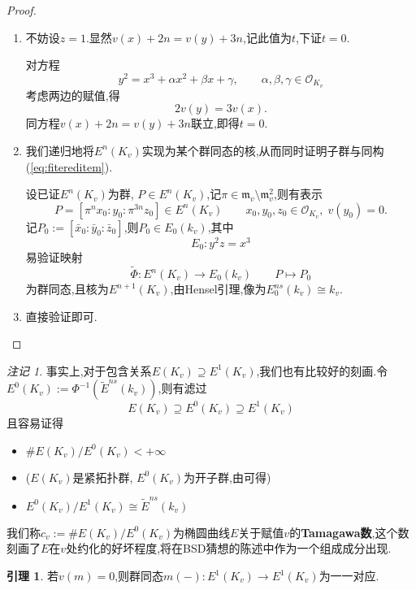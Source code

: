 \documentclass[12pt,A4paper,oneside,reqno]{amsart}
\numberwithin{equation}{section}
\theoremstyle{definition}
\newtheorem{lemma}[theorem]{引理}
\theoremstyle{plain}
\theoremstyle{plain}
\numberwithin{equation}{section}
\theoremstyle{remark}
\newtheorem{remark}[theorem]{注记}
\begin{document}
\begin{proof}\
\begin{enumerate}[1.]
	\item 不妨设$z=1$.显然$v(x)+2n=v(y)+3n$,记此值为$t$,下证$t=0$.
	
	对方程
	$$y^2=x^3+\alpha x^2 +\beta x+\gamma, \qquad \alpha,\beta, \gamma \in \mathcal{O}_{K_v}$$
	考虑两边的赋值,得
	$$2v(y)=3v(x).$$
	同方程$v(x)+2n=v(y)+3n$联立,即得$t=0$.
	\item 我们递归地将$E^n(K_v)$实现为某个群同态的核,从而同时证明子群与同构(\ref{eq:fitereditem}).

	设已证$E^{n}(K_v)$为群, $P \in E^{n}(K_v)$,记$\pi \in \mathfrak{m}_v \setminus \mathfrak{m}_v^2$,则有表示$$P=[\pi^{n}x_0:y_0:\pi^{3n}z_0] \in E^{n}(K_v)\qquad x_0,y_0,z_0 \in \mathcal{O}_{K_v}, \; v(y_0)=0.$$ 记$P_0:=[\bar{x}_0:\bar{y}_0:\bar{z}_0]$,则$P_0 \in E_0(k_v)$,其中
	$$E_0\colon y^2z=x^3$$
	易验证映射
	$$\tilde{\Phi}: E^{n}(K_v) \longrightarrow E_0(k_v) \qquad P \longmapsto P_0$$
	为群同态,且核为$E^{n+1}(K_v)$,由Hensel引理,像为$E_0^{ns}(k_v) \cong k_v$.
	\item 直接验证即可.
\end{enumerate}
\end{proof}
\begin{remark}
	事实上,对于包含关系$E(K_v) \supseteq E^1(K_v)$,我们也有比较好的刻画.令$E^0(K_v):=\Phi^{-1}(\tilde{E}^{ns}(k_v))$,则有滤过
	$$E(K_v) \supseteq E^0(K_v)\supseteq E^1(K_v)$$
	且容易证得
	\begin{itemize}
		\item $\#E(K_v)/E^0(K_v) < +\infty$ 
		\item[] ($E(K_v)$是紧拓扑群, $E^0(K_v)$为开子群,由\cite[p180,引理6.91]{fermat2013dream}可得)
		\item $E^0(K_v)/E^1(K_v) \cong \tilde{E}^{ns}(k_v)$
	\end{itemize}
我们称$c_v:=\#E(K_v)/E^0(K_v)$为椭圆曲线$E$关于赋值$v$的\textbf{Tamagawa数},这个数刻画了$E$在$v$处约化的好坏程度,将在BSD猜想的陈述中作为一个组成成分出现.
\end{remark}
\begin{lemma}\label{lem:iso}
若$v(m)=0$,则群同态$m(-): E^1(K_v)\longrightarrow E^1(K_v)$为一一对应.
\end{lemma}
\end{document}
